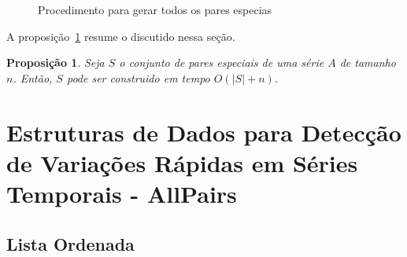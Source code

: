 \documentclass[12pt]{article}
\newtheorem{prop}[thm]{Proposição}
\begin{document}
\begin{figure}

\caption{Procedimento para gerar todos os pares especias}
\label{fig:GenSpecialPairs}
\end{figure}


A proposição~\ref{genspecialpairs} resume o discutido nessa seção. 

\begin{prop}
Seja $S$ o conjunto de pares especiais de uma série $A$ de tamanho $n$. Então, 
$S$ pode ser construido em tempo $O(|S| + n)$.
\label{genspecialpairs}
\end{prop}

\section{Estruturas de Dados para Detecção de Variações Rápidas em Séries Temporais - AllPairs}

\subsection{Lista Ordenada}
\end{document}
